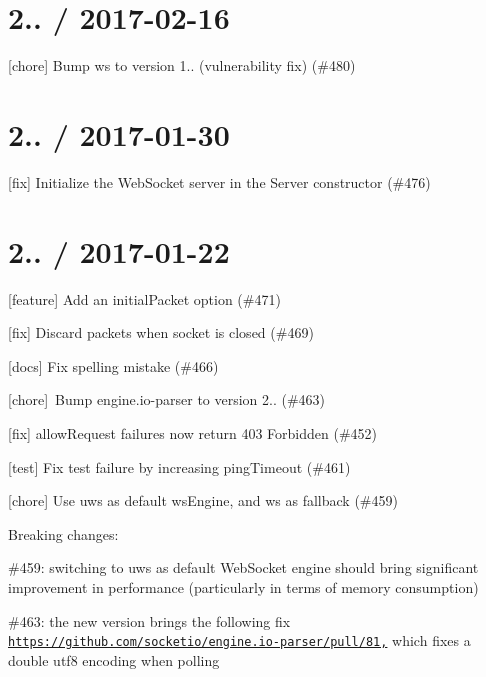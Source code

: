 \section*{2.. / 2017-\/02-\/16 }


\begin{DoxyItemize}
\item \mbox{[}chore\mbox{]} Bump ws to version 1.. (vulnerability fix) (\#480)
\end{DoxyItemize}

\section*{2.. / 2017-\/01-\/30 }


\begin{DoxyItemize}
\item \mbox{[}fix\mbox{]} Initialize the Web\+Socket server in the {\ttfamily Server} constructor (\#476)
\end{DoxyItemize}

\section*{2.. / 2017-\/01-\/22 }


\begin{DoxyItemize}
\item \mbox{[}feature\mbox{]} Add an {\ttfamily initial\+Packet} option (\#471)
\item \mbox{[}fix\mbox{]} Discard packets when socket is closed (\#469)
\item \mbox{[}docs\mbox{]} Fix spelling mistake (\#466)
\item \mbox{[}chore\mbox{]} \+Bump engine.\+io-\/parser to version 2.. (\#463)
\item \mbox{[}fix\mbox{]} {\ttfamily allow\+Request} failures now return 403 Forbidden (\#452)
\item \mbox{[}test\mbox{]} Fix test failure by increasing ping\+Timeout (\#461)
\item \mbox{[}chore\mbox{]} Use uws as default ws\+Engine, and ws as fallback (\#459)
\end{DoxyItemize}

Breaking changes\+:


\begin{DoxyItemize}
\item \#459\+: switching to uws as default Web\+Socket engine should bring significant improvement in performance (particularly in terms of memory consumption)
\item \#463\+: the new version brings the following fix \href{https://github.com/socketio/engine.io-parser/pull/81,}{\tt https\+://github.\+com/socketio/engine.\+io-\/parser/pull/81,} which fixes a double utf8 encoding when polling
\end{DoxyItemize}

